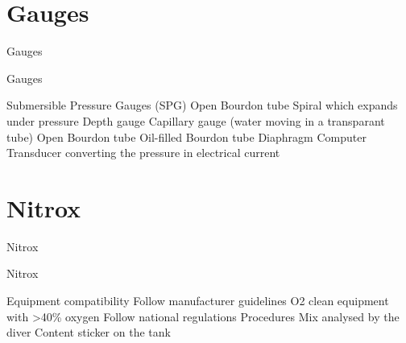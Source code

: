 \documentclass[aspectratio=1610,english,14pt]{beamer}
\begin{document}
\section{Gauges}

\begin{frame}{Gauges}
\end{frame}
\begin{frame}{Gauges}
	\begin{outline}
		\1 Submersible Pressure Gauges (SPG)
			\2 Open Bourdon tube
			\2 Spiral which expands under pressure
		\1 Depth gauge
			\2 Capillary gauge (water moving in a transparant tube)
			\2 Open Bourdon tube
			\2 Oil-filled Bourdon tube
			\2 Diaphragm
		\1 Computer
			\2 Transducer converting the pressure in electrical current
	\end{outline}
\end{frame}

\section{Nitrox}

\begin{frame}{Nitrox}
	\mypict{../img/nitrox}
\end{frame}
\begin{frame}{Nitrox}
	\begin{outline}
		\1 Equipment compatibility
			\2 Follow manufacturer guidelines
			\2 O2 clean equipment with >40\% oxygen
			\2 Follow national regulations
		\1 Procedures
			\2 Mix analysed by the diver
			\2 Content sticker on the tank
	\end{outline}
\end{frame}
\end{document}
